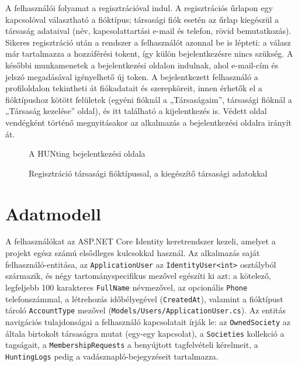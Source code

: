 A felhasználói folyamat a regisztrációval indul. A regisztrációs űrlapon egy kapcsolóval
választható a fióktípus; társasági fiók esetén az űrlap kiegészül a társaság adataival (név,
kapcsolattartási e-mail és telefon, rövid bemutatkozás). Sikeres regisztráció után a rendszer a
felhasználót azonnal be is lépteti: a válasz már tartalmazza a hozzáférési tokent, így külön
bejelentkezésre nincs szükség. A későbbi munkamenetek a bejelentkezési oldalon indulnak, ahol
e-mail-cím és jelszó megadásával igényelhető új token. A bejelentkezett felhasználó a
profiloldalon tekintheti át fiókadatait és szerepköreit, innen érhetők el a fióktípushoz kötött
felületek (egyéni fióknál a „Társaságaim”, társasági fióknál a „Társaság kezelése” oldal), és itt
található a kijelentkezés is. Védett oldal vendégként történő megnyitásakor az alkalmazás a
bejelentkezési oldalra irányít át.

\begin{figure}[htbp]
	\centering
	\caption{A HUNting bejelentkezési oldala}
	\label{fig:login-screen}
\end{figure}

\begin{figure}[htbp]
	\centering
	\caption{Regisztráció társasági fióktípussal, a kiegészítő társasági adatokkal}
	\label{fig:register-screen}
\end{figure}

\section{Adatmodell}
\label{sec:users-adatmodell}

A felhasználókat az ASP.NET Core Identity keretrendszer kezeli, amelyet a projekt egész számú
elsődleges kulcsokkal használ. Az alkalmazás saját felhasználó-entitása, az
\texttt{ApplicationUser} az \texttt{IdentityUser<int>} osztályból származik, és négy
tartományspecifikus mezővel egészíti ki azt: a kötelező, legfeljebb 100 karakteres
\texttt{FullName} névmezővel, az opcionális \texttt{Phone} telefonszámmal, a létrehozás
időbélyegével (\texttt{CreatedAt}), valamint a fióktípust tároló \texttt{AccountType} mezővel
(\texttt{Models/Users/ApplicationUser.cs}). Az entitás navigációs tulajdonságai a felhasználó
kapcsolatait írják le: az \texttt{OwnedSociety} az általa birtokolt társaságra mutat (egy-egy
kapcsolat), a \texttt{Societies} kollekció a tagságait, a \texttt{MembershipRequests} a benyújtott
tagfelvételi kérelmeit, a \texttt{HuntingLogs} pedig a vadásznapló-bejegyzéseit tartalmazza.

